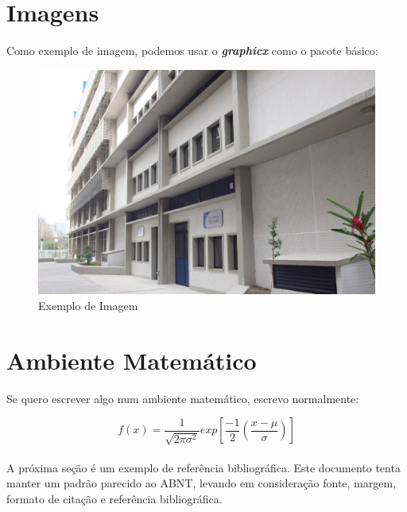 \documentclass[onehalfspacing, a4paper, 12pt]{econometria}
\begin{document}
\lipsum[1]


\section{Imagens}

Como exemplo de imagem, podemos usar o \textbf{\textit{graphicx}} como o pacote básico:

\begin{figure}[h]
\includegraphics[width=\textwidth]{ecouff.jpg}
\caption{Exemplo de Imagem}
\end{figure}


\section{Ambiente Matemático}

Se quero escrever algo num ambiente matemático, escrevo normalmente:

$$f(x)=\frac{1}{\sqrt{2\pi\sigma^2}}exp\left[\frac{-1}{2}\left(\frac{x-\mu}{\sigma}\right)\right]$$\\

A próxima seção é um exemplo de referência bibliográfica. Este documento tenta manter um padrão parecido ao ABNT, levando em consideração fonte, margem, formato de citação e referência bibliográfica.

\nocite{frisch2009problems,hobsbawm1995era}

\end{document}
